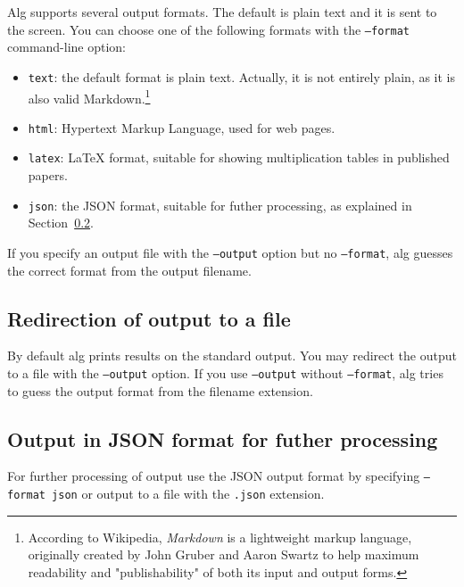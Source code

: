 \documentclass{article}
\begin{document}
Alg supports several output formats. The default is plain text and it
is sent to the screen. You can choose one of the following formats
with the \texttt{--format} command-line option:
%
\begin{itemize}
\item \texttt{text}: the default format is plain text. Actually, it is
  not entirely plain, as it is also valid Markdown.\footnote{According
    to Wikipedia, \emph{Markdown} is a lightweight markup language,
    originally created by John Gruber and Aaron Swartz to help maximum
    readability and "publishability" of both its input and output
    forms.}
\item \texttt{html}: Hypertext Markup Language, used for web pages.
\item \texttt{latex}: {\LaTeX} format, suitable for showing
  multiplication tables in published papers.
\item \texttt{json}: the JSON format, suitable for futher processing,
  as explained in Section~\ref{sec:json}.
\end{itemize}

If you specify an output file with the \texttt{--output} option but no
\texttt{--format}, alg guesses the correct format from the output
filename.

\subsection{Redirection of output to a file}

By default alg prints results on the standard output. You may redirect
the output to a file with the \texttt{--output} option. If you use
\texttt{--output} without \texttt{--format}, alg tries to guess the
output format from the filename extension.

\subsection{Output in JSON format for futher processing}
\label{sec:json}

For further processing of output use the JSON output format by
specifying \texttt{--format json} or output to a file with the
\texttt{.json} extension.
\end{document}
